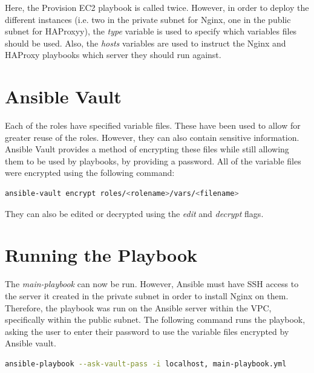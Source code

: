 \documentclass[a4paper]{article}
\begin{document}
    \noindent Here, the Provision EC2 playbook is called twice. However, in order to deploy the different instances (i.e. two in the private subnet for Nginx, one in the public subnet for HAProxyy), the \textit{type} variable is used to specify which variables files should be used. Also, the \textit{hosts} variables are used to instruct the Nginx and HAProxy playbooks which server they should run against.
    
  \section{Ansible Vault}
  Each of the roles have specified variable files. These have been used to allow for greater reuse of the roles. However, they can also contain sensitive information. Ansible Vault provides a method of encrypting these files while still allowing them to be used by playbooks, by providing a password. All of the variable files were encrypted using the following command:
  
  \noindent
  \begin{minipage}{\textwidth}
    \begin{lstlisting}[caption={vault.yml},label=vault,language=bash]
      ansible-vault encrypt roles/<rolename>/vars/<filename>
    \end{lstlisting}
  \end{minipage}
  
  \noindent They can also be edited or decrypted using the \textit{edit} and \textit{decrypt} flags.
  
  \section{Running the Playbook}
  The \textit{main-playbook} can now be run. However, Ansible must have SSH access to the server it created in the private subnet in order to install Nginx on them. Therefore, the playbook was run on the Ansible server within the VPC, specifically within the public subnet. The following command runs the playbook, asking the user to enter their password to use the variable files encrypted by Ansible vault.
  
  \noindent
  \begin{minipage}{\textwidth}
    \begin{lstlisting}[caption={run.yml},label=run,language=bash]
      ansible-playbook --ask-vault-pass -i localhost, main-playbook.yml
    \end{lstlisting}
  \end{minipage}
  
\end{document}
